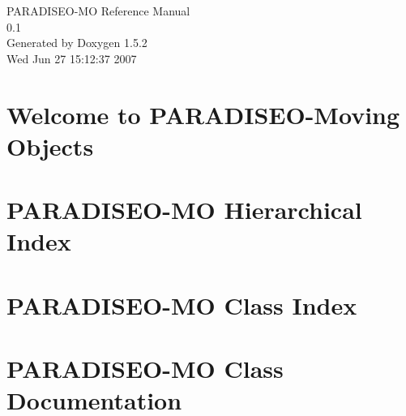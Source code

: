 \documentclass[a4paper]{book}
\begin{document}
\begin{titlepage}
\vspace*{7cm}
\begin{center}
{\Large PARADISEO-MO Reference Manual\\[1ex]\large 0.1 }\\
\vspace*{1cm}
{\large Generated by Doxygen 1.5.2}\\
\vspace*{0.5cm}
{\small Wed Jun 27 15:12:37 2007}\\
\end{center}
\end{titlepage}
\clearemptydoublepage
{}
\tableofcontents
\clearemptydoublepage
{}
\chapter{Welcome to PARADISEO-Moving Objects }
\label{index}
\chapter{PARADISEO-MO Hierarchical Index}

\chapter{PARADISEO-MO Class Index}

\chapter{PARADISEO-MO Class Documentation}































\printindex
\end{document}
